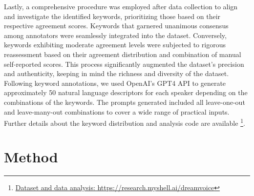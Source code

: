 \documentclass{Interspeech2024}
\begin{document}
Lastly, a comprehensive procedure was employed after data collection to align and investigate the identified keywords, prioritizing those based on their respective agreement scores. Keywords that garnered unanimous consensus among annotators were seamlessly integrated into the dataset. Conversely, keywords exhibiting moderate agreement levels were subjected to rigorous reassessment based on their agreement distribution and combination of manual self-reported scores. This process significantly augmented the dataset’s precision and authenticity, keeping in mind the richness and diversity of the dataset. Following keyword annotations, we used OpenAI's GPT4 \cite{achiam2023gpt} API to generate approximately 50 natural language descriptors for each speaker depending on the combinations of the keywords. The prompts generated included all leave-one-out and leave-many-out combinations to cover a wide range of practical inputs. Further details about the keyword distribution and analysis code are available \footnote{\label{note1} \href {}{Dataset and data analysis: https://research.myshell.ai/dreamvoice}}.


\section{Method}
\end{document}
